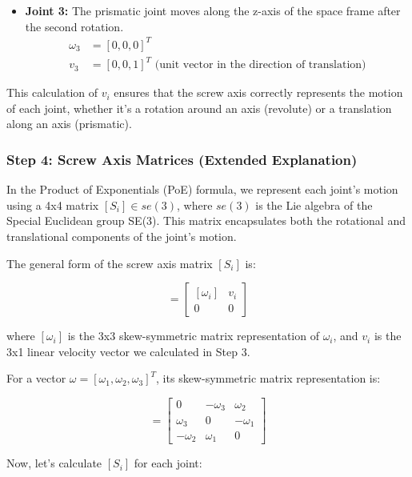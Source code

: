 \begin{solution}
\begin{itemize}
	\item \textbf{Joint 3:} The prismatic joint moves along the z-axis of the space frame after the second rotation.
	\begin{align*}
	\omega_3 &= [0, 0, 0]^T \\
	v_3 &= [0, 0, 1]^T \text{ (unit vector in the direction of translation)}
	\end{align*}
\end{itemize}

This calculation of $v_i$ ensures that the screw axis correctly represents the motion of each joint, whether it's a rotation around an axis (revolute) or a translation along an axis (prismatic).

\subsubsection*{Step 4: Screw Axis Matrices (Extended Explanation)}

In the Product of Exponentials (PoE) formula, we represent each joint's motion using a 4x4 matrix $[S_i] \in se(3)$, where $se(3)$ is the Lie algebra of the Special Euclidean group SE(3). This matrix encapsulates both the rotational and translational components of the joint's motion.

The general form of the screw axis matrix $[S_i]$ is:

\begin{equation}
[S_i] = \begin{bmatrix}
[\omega_i] & v_i \\
0 & 0
\end{bmatrix}
\end{equation}

where $[\omega_i]$ is the 3x3 skew-symmetric matrix representation of $\omega_i$, and $v_i$ is the 3x1 linear velocity vector we calculated in Step 3.

For a vector $\omega = [\omega_1, \omega_2, \omega_3]^T$, its skew-symmetric matrix representation is:

\begin{equation}
[\omega] = \begin{bmatrix}
0 & -\omega_3 & \omega_2 \\
\omega_3 & 0 & -\omega_1 \\
-\omega_2 & \omega_1 & 0
\end{bmatrix}
\end{equation}

Now, let's calculate $[S_i]$ for each joint:


\end{solution}
